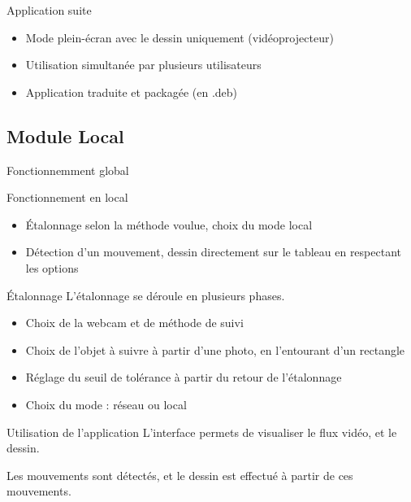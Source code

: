 \documentclass{beamer}
\begin{document}
      \begin{frame}{Application suite}
        \begin{itemize}
          \item Mode plein-écran avec le dessin uniquement (vidéoprojecteur)
          \item Utilisation simultanée par plusieurs utilisateurs
          \item Application traduite et packagée (en .deb)
        \end{itemize}
      \end{frame}
      
		
	\subsection{Module Local}
		\begin{frame}{Fonctionnemment global}
			\begin{block}{Fonctionnement en local}
				\begin{itemize}
				\item Étalonnage selon la méthode voulue, choix du mode local
				\item Détection d'un mouvement, dessin directement sur le tableau en respectant les options
				\end{itemize}
			\end{block}
		\end{frame}
		
		\begin{frame}{Étalonnage}
			L'étalonnage se déroule en plusieurs phases.
			\begin{itemize}
			\item Choix de la webcam et de méthode de suivi
			\item Choix de l'objet à suivre à partir d'une photo, en l'entourant d'un rectangle
			\item Réglage du seuil de tolérance à partir du retour de l'étalonnage
			\item Choix du mode : réseau ou local
			\end{itemize}
		\end{frame}
		
		\begin{frame}{Utilisation de l'application}
		L'interface permets de visualiser le flux vidéo, et le dessin.
		
		Les mouvements sont détectés, et le dessin est effectué à partir de ces mouvements.
		\end{frame}
		
\end{document}
